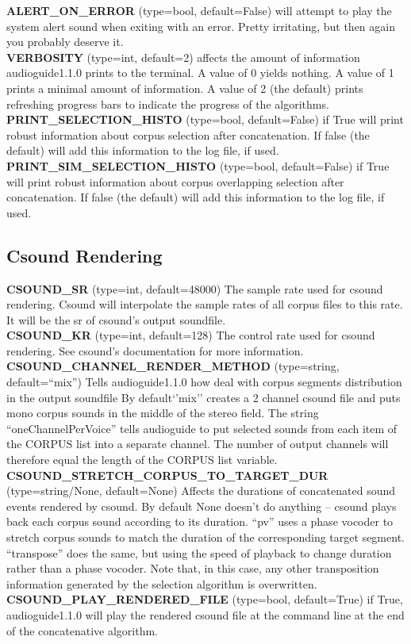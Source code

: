 \documentclass{article}
\newcommand{\optEntry}[4]{\textbf{#1} (type=#2, default=#3) #4\hspace{0.5em}\\}
\newcommand{\ag}{audioguide1.1.0\xspace}
\begin{document}
\begin{spacing}{1.2}
\optEntry{ALERT\_ON\_ERROR}{bool}{False}{will attempt to play the system alert sound when exiting with an error.  Pretty irritating, but then again you probably deserve it.}

\optEntry{VERBOSITY}{int}{2}{affects the amount of information \ag prints to the terminal.  A value of 0 yields nothing.  A value of 1 prints a minimal amount of information.  A value of 2 (the default) prints refreshing progress bars to indicate the progress of the algorithms.}

\optEntry{PRINT\_SELECTION\_HISTO}{bool}{False}{if True will print robust information about corpus selection after concatenation.  If false (the default) will add this information to the log file, if used.}

\optEntry{PRINT\_SIM\_SELECTION\_HISTO}{bool}{False}{if True will print robust information about corpus overlapping selection after concatenation.  If false (the default) will add this information to the log file, if used.}


\subsection{Csound Rendering}
\optEntry{CSOUND\_SR}{int}{48000}{The sample rate used for csound rendering.  Csound will interpolate the sample rates of all corpus files to this rate.  It will be the sr of csound's output soundfile.}

\optEntry{CSOUND\_KR}{int}{128}{The control rate used for csound rendering.  See csound's documentation for more information.}

\optEntry{CSOUND\_CHANNEL\_RENDER\_METHOD}{string}{``mix''}{Tells \ag how deal with corpus segments distribution in the output soundfile  By default`'mix'' creates a 2 channel csound file and puts mono corpus sounds in the middle of the stereo field.  The string ``oneChannelPerVoice'' tells audioguide to put selected sounds from each item of the CORPUS list into a separate channel.  The number of output channels will therefore equal the length of the CORPUS list variable.}

\optEntry{CSOUND\_STRETCH\_CORPUS\_TO\_TARGET\_DUR}{string/None}{None}{Affects the durations of concatenated sound events rendered by csound.  By default None doesn't do anything -- csound plays back each corpus sound according to its duration.  ``pv'' uses a phase vocoder to stretch corpus sounds to match the duration of the corresponding target segment.  ``transpose'' does the same, but using the speed of playback to change duration rather than a phase vocoder.  Note that, in this case, any other transposition information generated by the selection algorithm is overwritten.}

\optEntry{CSOUND\_PLAY\_RENDERED\_FILE}{bool}{True}{if True, \ag will play the rendered csound file at the command line at the end of the concatenative algorithm.}







\end{spacing}
\end{document}
